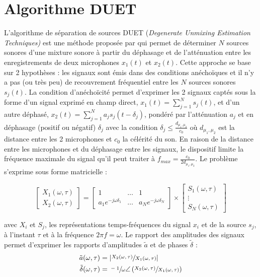 \section{Algorithme DUET}

L'algorithme de séparation de sources DUET (\textit{Degenerate Unmixing Estimation Techniques)} est une méthode proposée par \cite{rickard2007duet} qui permet de déterminer $N$ sources sonores d'une mixture sonore à partir du déphasage et de l'atténuation entre les enregistrements de deux microphones $x_1(t)$ et $x_2(t)$. Cette approche se base sur 2 hypothèses : les signaux sont émis dans des conditions anéchoïques et il n'y a pas (ou très peu) de recouvrement fréquentiel entre les $N$ sources sonores $s_j(t)$. La condition d'anéchoïcité permet d'exprimer les 2 signaux captés sous la forme d'un signal exprimé en champ direct, $x_1(t) = \sum_{j = 1}^{N}s_j(t)$, et d'un autre déphasé, $x_2(t) = \sum_{j = 1}^{N} a_j s_j(t-\delta_j)$, pondéré par l'atténuation $a_j$ et en déphasage (positif ou négatif) $\delta_j$ avec la condition $\delta_j \leqslant \frac{d_{\mu_1,\mu_2}}{c_0}$ où $d_{\mu_1,\mu_2}$ est la distance entre les 2 microphones et $c_0$ la célérité du son. En raison de la distance entre les microphones et du déphasage entre les signaux, le dispositif limite la fréquence maximale du signal qu'il peut traiter à $f_{max} = \frac{c_0}{2 d_{\mu_1,\mu_2}}$. Le problème s'exprime sous forme matricielle :

\begin{equation}\label{eq:algo-DUET}
\begin{bmatrix}
X_1(\omega,\tau) \\
X_2(\omega,\tau)
\end{bmatrix} =
\begin{bmatrix}
1 & \dots & 1 \\
a_1e^{-j\omega\delta_1} & \dots & a_Ne^{-j\omega\delta_N}
\end{bmatrix} \times
\begin{bmatrix}
S_1(\omega,\tau) \\
\vdots \\
S_N(\omega,\tau)
\end{bmatrix}
\end{equation}

avec $X_i$ et $S_j$, les représentations temps-fréquences du signal $x_i$ et de la source $s_j$, à l'instant $\tau$ et à la fréquence $2\pi f = \omega$.
Le rapport des amplitudes des signaux permet d'exprimer les rapports d'amplitudes $\tilde{a}$ et de phases $\tilde{\delta}$ :
\begin{subequations}
\begin{align}
\tilde{a}(\omega,\tau) &= \vert\sfrac{X_2(\omega,\tau)}{X_1(\omega,\tau)}\vert \\
\tilde{\delta}(\omega,\tau) &= \sfrac{-1}{\omega}\angle\left(\sfrac{X_2(\omega,\tau)}{X_1(\omega,\tau)}\right)
\end{align}
\end{subequations}

